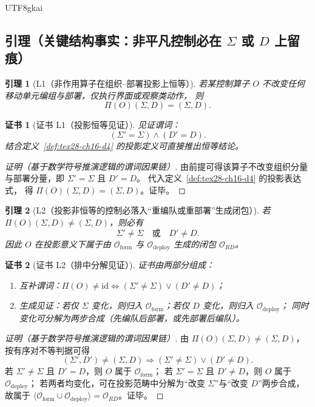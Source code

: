 \documentclass[12pt]{article}
\newtheorem{lemma}{引理}[section]
\newtheorem{Certificate}{证书}[section]
\begin{document}
\begin{CJK*}{UTF8}{gkai}
\subsection{引理（关键结构事实：非平凡控制必在 $\Sigma$ 或 $D$ 上留痕）}
\label{subsec:tex28-ch16-lemmas}

\begin{lemma}[L1（非作用算子在组织--部署投影上恒等）]
\label{lem:tex28-ch16-l1}
若某控制算子 $O$ 不改变任何移动单元编组与部署，仅执行界面或观察类动作，
则
\[
  \Pi(O)(\Sigma,D)=(\Sigma,D).
\]
\end{lemma}

\begin{Certificate}[证书 L1（投影恒等见证）]
\label{cert:tex28-ch16-l1}
见证谓词：
\[
  (\Sigma'=\Sigma)\wedge(D'=D).
\]
结合定义~\ref{def:tex28-ch16-d4} 的投影定义可直接推出恒等结论。
\end{Certificate}

\begin{proof}[证明（基于数学符号推演逻辑的谓词因果链）]
由前提可得该算子不改变组织分量与部署分量，即 $\Sigma'=\Sigma$ 且 $D'=D$。
代入定义~\ref{def:tex28-ch16-d4} 的投影表达式，
得 $\Pi(O)(\Sigma,D)=(\Sigma,D)$。证毕。
\end{proof}

\begin{lemma}[L2（投影非恒等的控制必落入“重编队或重部署”生成闭包）]
\label{lem:tex28-ch16-l2}
若 $\Pi(O)(\Sigma,D)\neq(\Sigma,D)$，则必有
\[
  \Sigma'\neq\Sigma \quad\text{或}\quad D'\neq D.
\]
因此 $O$ 在投影意义下属于由 $\mathcal O_{\mathrm{form}}$ 与 $\mathcal O_{\mathrm{deploy}}$ 生成的闭包 $\mathcal O_{RD}$。
\end{lemma}

\begin{Certificate}[证书 L2（排中分解见证）]
\label{cert:tex28-ch16-l2}
证书由两部分组成：
\begin{enumerate}
  \item 互补谓词：$\Pi(O)\neq\mathrm{id}\iff (\Sigma'\neq\Sigma)\vee(D'\neq D)$；
  \item 生成见证：若仅 $\Sigma$ 变化，则归入 $\mathcal O_{\mathrm{form}}$；若仅 $D$ 变化，则归入 $\mathcal O_{\mathrm{deploy}}$；
  同时变化可分解为两步合成（先编队后部署，或先部署后编队）。
\end{enumerate}
\end{Certificate}

\begin{proof}[证明（基于数学符号推演逻辑的谓词因果链）]
由 $\Pi(O)(\Sigma,D)\neq(\Sigma,D)$，按有序对不等判据可得
\[
  (\Sigma',D')\neq(\Sigma,D)
  \Rightarrow
  (\Sigma'\neq\Sigma)\vee(D'\neq D).
\]
若 $\Sigma'\neq\Sigma$ 且 $D'=D$，则 $O$ 属于 $\mathcal O_{\mathrm{form}}$；
若 $\Sigma'=\Sigma$ 且 $D'\neq D$，则 $O$ 属于 $\mathcal O_{\mathrm{deploy}}$；
若两者均变化，可在投影范畴中分解为“改变 $\Sigma$”与“改变 $D$”两步合成，
故属于 $\langle\mathcal O_{\mathrm{form}}\cup\mathcal O_{\mathrm{deploy}}\rangle=\mathcal O_{RD}$。证毕。
\end{proof}


\end{CJK*}
\end{document}
